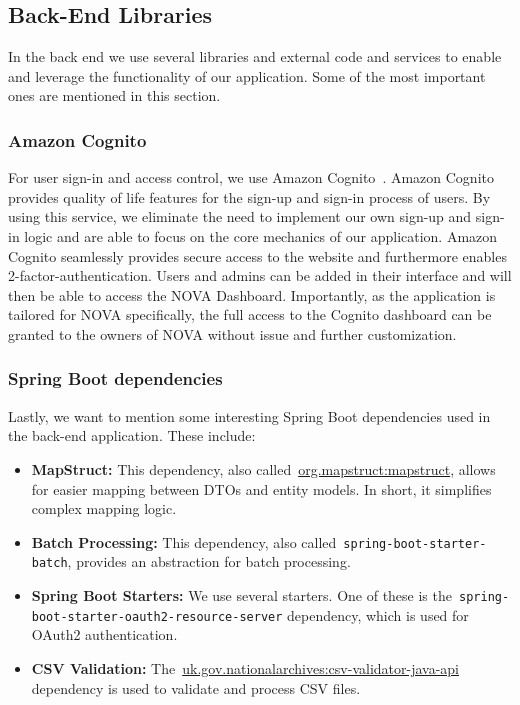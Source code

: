 \subsection{Back-End Libraries}\label{subsec:back-end-libraries}

In the back end we use several libraries and external code and services to enable and leverage the functionality of our
application.
Some of the most important ones are mentioned in this section.

\subsubsection{Amazon Cognito}

For user sign-in and access control, we use Amazon Cognito~\cite{cognito2024}.
Amazon Cognito provides quality of life features for the sign-up and sign-in process of users.
By using this service, we eliminate the need to implement our own sign-up and sign-in logic and are able to focus on the
core mechanics of our application.
Amazon Cognito seamlessly provides secure access to the website and furthermore enables 2-factor-authentication.
Users and admins can be added in their interface and will then be able to access the NOVA Dashboard.
Importantly, as the application is tailored for NOVA specifically, the full access to the Cognito dashboard can be
granted to the owners of NOVA without issue and further customization.

\subsubsection{Spring Boot dependencies}

Lastly, we want to mention some interesting Spring Boot dependencies used in the back-end application.
These include:

\begin{itemize}
    \item \textbf{MapStruct:}
    This dependency, also called~\url{org.mapstruct:mapstruct}, allows for easier mapping between DTOs and
    entity models.
    In short, it simplifies complex mapping logic.

    \item \textbf{Batch Processing:}
    This dependency, also called~\texttt{spring-boot-starter-batch}, provides an abstraction for batch processing.

    \item \textbf{Spring Boot Starters:}
    We use several starters.
    One of these is the~\texttt{spring-boot-starter-oauth2-resource-server} dependency, which is used for
    OAuth2 authentication.

    \item \textbf{CSV Validation:}
    The~\url{uk.gov.nationalarchives:csv-validator-java-api} dependency is used to validate and process CSV
    files.
\end{itemize}
